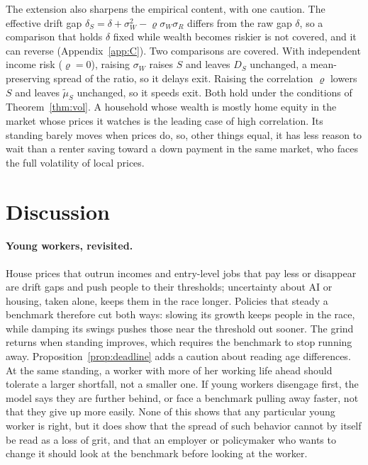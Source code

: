 \documentclass[12pt]{article}
\theoremstyle{definition}
\theoremstyle{remark}
\newcommand{\mut}{\tilde\mu}
\theoremstyle{plain}
\theoremstyle{definition}
\begin{document}
The extension also sharpens the empirical content, with one caution. The effective drift gap $\delta_S=\delta+\sigma_W^2-\varrho\sigma_W\sigma_R$ differs from the raw gap $\delta$, so a comparison that holds $\delta$ fixed while wealth becomes riskier is not covered, and it can reverse (Appendix~\ref{app:C}). Two comparisons are covered. With independent income risk ($\varrho=0$), raising $\sigma_W$ raises $S$ and leaves $D_S$ unchanged, a mean-preserving spread of the ratio, so it delays exit. Raising the correlation $\varrho$ lowers $S$ and leaves $\mut_S$ unchanged, so it speeds exit. Both hold under the conditions of Theorem~\ref{thm:vol}. A household whose wealth is mostly home equity in the market whose prices it watches is the leading case of high correlation. Its standing barely moves when prices do, so, other things equal, it has less reason to wait than a renter saving toward a down payment in the same market, who faces the full volatility of local prices.

\section{Discussion}\label{sec:discussion}

\paragraph{Young workers, revisited.} House prices that outrun incomes and entry-level jobs that pay less or disappear are drift gaps and push people to their thresholds; uncertainty about AI or housing, taken alone, keeps them in the race longer. Policies that steady a benchmark therefore cut both ways: slowing its growth keeps people in the race, while damping its swings pushes those near the threshold out sooner. The grind returns when standing improves, which requires the benchmark to stop running away. Proposition~\ref{prop:deadline} adds a caution about reading age differences. At the same standing, a worker with more of her working life ahead should tolerate a larger shortfall, not a smaller one. If young workers disengage first, the model says they are further behind, or face a benchmark pulling away faster, not that they give up more easily. None of this shows that any particular young worker is right, but it does show that the spread of such behavior cannot by itself be read as a loss of grit, and that an employer or policymaker who wants to change it should look at the benchmark before looking at the worker.
\end{document}
